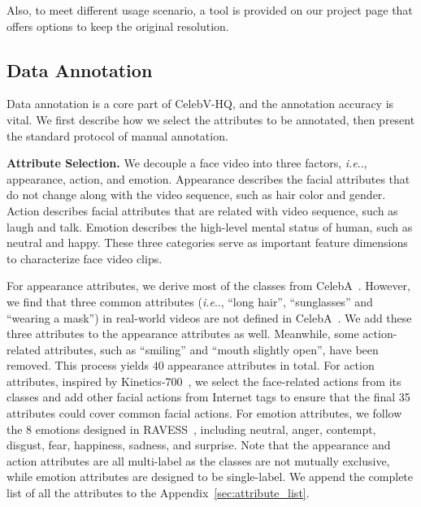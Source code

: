 \documentclass[runningheads]{llncs}
\makeatletter
\DeclareRobustCommand\onedot{\futurelet\@let@token\@onedot}
\def\@onedot{\ifx\@let@token.\else.\null\fi\xspace}
\def\ie{\emph{i.e}\onedot} \def\Ie{\emph{I.e}\onedot}
\makeatother
\begin{document}
Also, to meet different usage scenario, a tool is provided on our project page that offers options to keep the original resolution.






\subsection{Data Annotation}
Data annotation is a core part of CelebV-HQ, and the annotation accuracy is vital. We first describe how we select the attributes to be annotated, then present the standard protocol of manual annotation.


\noindent
\textbf{Attribute Selection.} We decouple a face video into three factors, \ie,  appearance, action, and emotion. Appearance describes the facial attributes that do not change along with the video sequence, such as hair color and gender. Action describes facial attributes that are related with video sequence, such as laugh and talk. Emotion describes the high-level mental status of human, such as neutral and happy.
These three categories serve as important feature dimensions to characterize face video clips.


For appearance attributes, we derive most of the classes from CelebA~\cite{celeba15}. However, we find that three common attributes (\ie, ``long hair'', ``sunglasses'' and ``wearing a mask'') in real-world videos are not defined in CelebA~\cite{celeba15}. We add these three attributes to the appearance attributes as well.
Meanwhile, some action-related attributes, such as ``smiling'' and ``mouth slightly open'', have been removed. This process yields $40$ appearance attributes in total.
For action attributes, inspired by Kinetics-700~\cite{kinetics700}, we select the face-related actions from its classes and add other facial actions from Internet tags to ensure that the final 35 attributes could cover common facial actions. For emotion attributes, we follow the $8$ emotions designed in RAVESS~\cite{RAVDESS}, including neutral, anger, contempt, disgust, fear, happiness, sadness, and surprise. Note that the appearance and action attributes are all multi-label as the classes are not mutually exclusive, while emotion attributes are designed to be single-label. We append the complete list of all the attributes to the Appendix~\ref{sec:attribute_list}.
\end{document}
